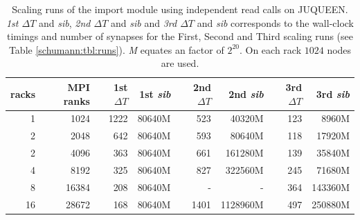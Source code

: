 \begin{table}[h!]
\begin{center}
\begin{tabular}{|r|r|r|r|r|r|r|r|}
\hline
racks & MPI ranks & 1st $\Delta T$ & 1st \emph{sib} & 2nd $\Delta T$ & 2nd \emph{sib} & 3rd $\Delta T$ & 3rd \emph{sib} \\
\hline\hline
1  & 1024      & 1222 & 80640M & 523 & 40320M & 123 & 8960M \\
2  & 2048      & 642 & 80640M  & 593 & 80640M & 118 & 17920M\\
2  & 4096      & 363 & 80640M  & 661 & 161280M & 139 & 35840M\\
4  & 8192     & 325 & 80640M & 827 & 322560M & 245 & 71680M \\
8  & 16384    & 208 & 80640M & -   & - &  364 & 143360M \\
16  & 28672    & 168 & 80640M & 1401 & 1128960M & 497 & 250880M\\
\hline
\end{tabular}
\end{center}
\caption[Scaling runs of import module using independent read calls on JUQUEEN]{Scaling runs of the import module using independent read calls on JUQUEEN. \emph{1st $\Delta T$} and \emph{sib}, \emph{2nd $\Delta T$} and \emph{sib} and
  \emph{3rd $\Delta T$} and \emph{sib} corresponds to the wall-clock timings and number of synapses for the First, Second and Third scaling runs (see Table \ref{schumann:tbl:runs}). \emph{M} equates an factor of $2^{20}$. On each rack $1024$ nodes are used.}
\label{schumann:tbl:scalruns}
\end{table}



